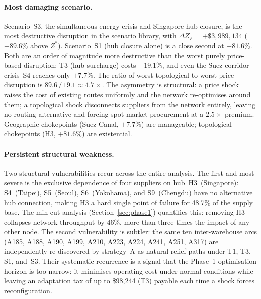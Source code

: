  
\paragraph{Most damaging scenario.}
Scenario~S3, the simultaneous energy crisis and Singapore hub
closure,  is the most destructive disruption in the scenario
library, with $\Delta Z_F = +\$3{,}989{,}134$ ($+89.6\%$ above
$Z^*$). Scenario~S1 (hub closure alone) is a close second at
$+81.6\%$. Both are an order of magnitude more destructive than
the worst purely price-based disruption: T3 (hub surcharge)
costs $+19.1\%$, and even the Suez corridor crisis~S4 reaches
only $+7.7\%$. The ratio of worst topological to worst price
disruption is $89.6\,/\,19.1 \approx 4.7\times$. The asymmetry
is structural: a price shock raises the cost of existing routes
uniformly and the network re-optimises around them; a topological
shock disconnects suppliers from the network entirely, leaving
no routing alternative and forcing spot-market procurement at
a $2.5\times$ premium. Geographic chokepoints (Suez Canal,
$+7.7\%$) are manageable; topological chokepoints (H3,
$+81.6\%$) are existential.
 
\paragraph{Persistent structural weakness.}
Two structural vulnerabilities recur across the entire analysis.
The first and most severe is the exclusive dependence of
four suppliers on hub~H3~(Singapore): S4~(Taipei),
S5~(Seoul), S6~(Yokohama), and S9~(Chengdu) have no alternative
hub connection, making H3 a hard single point of failure for
48.7\% of the supply base. The min-cut analysis
(Section~\ref{sec:phase1}) quantifies this: removing H3 collapses
network throughput by 46\%, more than three times the impact of
any other node. The second vulnerability is subtler: the same
ten inter-warehouse arcs (A185, A188, A190, A199, A210, A223,
A224, A241, A251, A317) are independently re-discovered by
strategy~A as natural relief paths under T1, T3, S1, and~S3.
Their systematic recurrence is a signal that the Phase~1
optimisation horizon is too narrow: it minimises operating cost
under normal conditions while leaving an adaptation tax of up to
\$98{,}244 (T3) payable each time a shock forces reconfiguration.
\vspace{-4pt}
